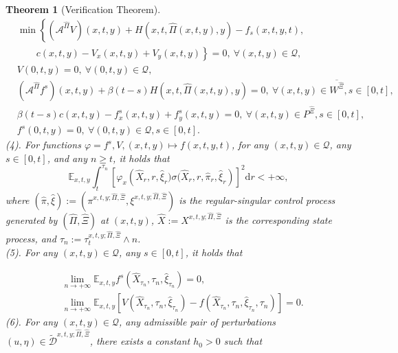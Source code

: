 \documentclass[10pt,a4paper]{amsart}
\newtheorem{theorem}{Theorem}
\begin{document}
\begin{theorem}[Verification Theorem]
\begin{subequations}
\begin{align}
&\min\left\{\left(\mathcal{A}^{\hat{\Pi}}V\right)(x,t,y)+H\left(x,t,\hat{\Pi}(x,t,y),y\right)-f_s(x,t,y,t),\right.\nonumber\\
&\left.\quad \quad c(x,t,y)-V_{x}(x,t,y)+V_{y}(x,t,y)\right\}=0,\ \forall (x,t,y)\in\mathcal{Q}, \label{v}\\
&V(0,t,y)=0,\ \forall(0,t,y)\in\mathcal{Q},\label{vT}\\
&\left(\mathcal{A}^{\hat{\Pi}}f^{s}\right)(x,t,y)+\beta(t-s)H\left(x,t,\hat\Pi(x,t,y),y\right)=0,\ \forall (x,t,y)\in \overline{W^{\hat{\Xi}}}, s\in[0,t],\label{fw}\\
& \beta(t-s)c(x,t,y)-f^{s}_{x}(x,t,y)+f^{s}_{y}(x,t,y)=0,\ \forall (x,t,y)\in P^{\hat{\Xi}}, s\in[0,t],\label{fp}\\
&f^{s}(0,t,y)=0,\ \forall (0,t,y)\in\mathcal{Q}, s\in[0,t].\label{fT}
\end{align}
\end{subequations}
(4). For functions $\varphi=f^{s},V,(x,t,y)\mapsto f(x,t,y,t)$, for any $(x,t,y)\in\mathcal{Q}$, any  $s\in[0,t]$, and any $n\geq t$, it holds that 
\begin{equation}
\mathbb{E}_{x,t,y}\int_{t}^{\tau_n}\left[\varphi_{x}\left(\hat{X}_{r},r,\hat\xi_{r})\sigma(\hat{X}_{r},r,\hat\pi_r,\hat\xi_{r}\right)\right]^{2}\mathrm{d}r<+\infty,
\label{martingale}\end{equation}
where $\left(\hat{\pi},\hat{\xi}\right):=\left(\pi^{x,t,y;\hat{\Pi},\hat{\Xi}},\xi^{x,t,y;\hat{\Pi},\hat{\Xi}}\right)$ is the regular-singular control process generated by $\left(\hat{\Pi},\hat{\Xi}\right)$ at $(x,t,y)$, $\hat{X}:=X^{x,t,y;\hat{\Pi},\hat{\Xi}}$ is the corresponding state process, and $\tau_{n}:=\tau^{x,t,y;\hat{\Pi},\hat{\Xi}}_{t}\wedge n$.\\
(5). For any $(x,t,y)\in\mathcal{Q}$, any $s\in[0,t]$, it holds that 

\begin{align}
&\lim\limits_{n\rightarrow+\infty}\mathbb{E}_{x,t,y}f^{s}\left(\hat{X}_{\tau_{n}},\tau_{n},\hat{\xi}_{\tau_{n}}\right)=0,\label{finfty1}\\
&\lim\limits_{n\rightarrow+\infty}\mathbb{E}_{x,t,y}\left[V\left(\hat{X}_{\tau_{n}},\tau_{n},\hat{\xi}_{\tau_{n}}\right)-f\left(\hat{X}_{\tau_{n}},\tau_{n},\hat{\xi}_{\tau_{n}},\tau_{n}\right)\right]=0.\label{finfty2}
\end{align}
(6). For any $(x,t,y)\in\mathcal{Q}$, any admissible pair of perturbations $(u,\eta)\in\mathcal{\tilde D}^{x,t,y;\hat\Pi,\hat\Xi}$, there exists a constant $h_0>0$ such that


\end{theorem}
\end{document}
